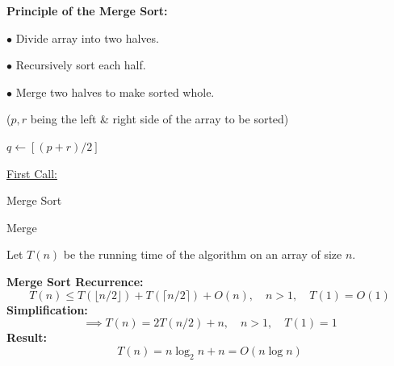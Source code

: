 \documentclass[10pt]{article}
\begin{document}
\textbf{Principle of the Merge Sort:}

$\bullet$ Divide array into two halves.

$\bullet$ Recursively sort each half.

$\bullet$ Merge two halves to make sorted whole.

\begin{algorithm}
	\SetAlgoLined
	($p, r$ being the left \& right side of the array to be sorted){
		
		$q \gets [(p+r)/2]$
		
		
		
		
		\underline{First Call:} 
	}
	\caption{Merge Sort}
\end{algorithm}

\begin{algorithm}
	\SetAlgoLined
	\caption{Merge}
\end{algorithm}

Let $T(n)$ be the running time of the algorithm on an array of size $n$.

\noindent \textbf{Merge Sort Recurrence:}
$$
T(n) \leq T(\lfloor n/2 \rfloor) + T(\lceil n/2 \rceil) + O(n), \quad n>1, \quad T(1) = O(1)
$$
\textbf{Simplification:}
$$
\implies T(n) = 2T(n/2) + n, \quad n>1, \quad T(1) = 1
$$
\textbf{Result:}
$$
T(n) = n\log_2 n + n = O(n\log n)
$$
\end{document}
